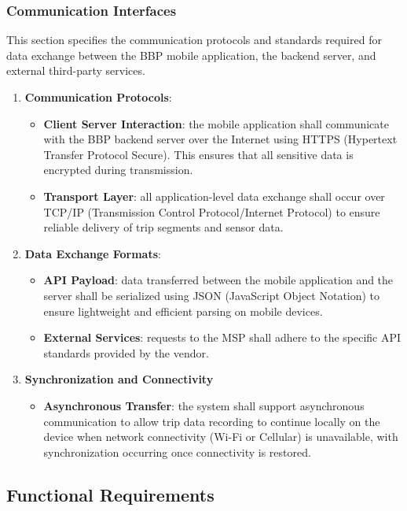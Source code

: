 \documentclass{article}
\begin{document}
\subsubsection{Communication Interfaces}
This section specifies the communication protocols and standards required for data exchange between the BBP mobile application, the backend server, and external third-party services.
\begin{enumerate}
    \item \textbf{Communication Protocols}:
    \begin{itemize}
        \item \textbf{Client Server Interaction}: the mobile application shall communicate with the BBP backend server over the Internet using HTTPS (Hypertext Transfer Protocol Secure). This ensures that all sensitive data is encrypted during transmission.
        \item \textbf{Transport Layer}: all application-level data exchange shall occur over TCP/IP (Transmission Control Protocol/Internet Protocol) to ensure reliable delivery of trip segments and sensor data.
    \end{itemize}
    \item \textbf{Data Exchange Formats}:
    \begin{itemize}
        \item \textbf{API Payload}: data transferred between the mobile application and the server shall be serialized using JSON (JavaScript Object Notation) to ensure lightweight and efficient parsing on mobile devices.
        \item \textbf{External Services}: requests to the MSP shall adhere to the specific API standards provided by the vendor.
    \end{itemize}
    \item \textbf{Synchronization and Connectivity}
    \begin{itemize}
        \item \textbf{Asynchronous Transfer}: the system shall support asynchronous communication to allow trip data recording to continue locally on the device when network connectivity (Wi-Fi or Cellular) is unavailable, with synchronization occurring once connectivity is restored.
    \end{itemize}
\end{enumerate}

\subsection{Functional Requirements}
\end{document}
